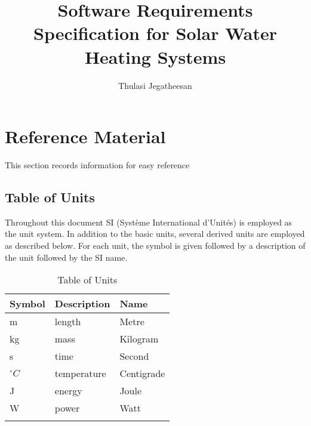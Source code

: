 \documentclass[12pt]{article}
\title{Software Requirements Specification for Solar Water Heating Systems}
\author{Thulasi Jegatheesan}
\begin{document}
\maketitle
\tableofcontents
\newpage
\section{Reference Material}
\label{Sec:RM}
This section records information for easy reference
\subsection{Table of Units}
\label{Sec:ToU}
Throughout this document SI (Syst\`{e}me International d'Unit\'{e}s) is employed as the unit system. In addition to the basic units, several derived units are employed as described below. For each unit, the symbol is given followed by a description of the unit followed by the SI name.
\begin{longtable}{l l l}
\toprule
Symbol & Description & Name
\\
\midrule
m & length & Metre
\\
kg & mass & Kilogram
\\
s & time & Second
\\
${}^{\circ}C$ & temperature & Centigrade
\\
J & energy & Joule
\\
W & power & Watt
\\
\bottomrule
\caption{Table of Units}
\label{Table:ToU}
\end{longtable}
\end{document}
